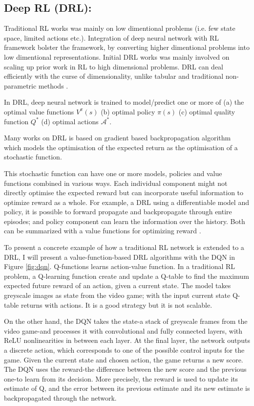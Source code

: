 \subsection*{Deep RL (DRL):}
Traditional RL works was mainly on low dimentional problems (i.e. few state space, limited actions etc.). Integration of deep neural network with RL framework bolster the framework, by converting higher dimentional problems into low dimentional representations. Initial DRL works was mainly involved on scaling up prior work in RL to high dimensional problems.
DRL can deal
efficiently with the curse of dimensionality, unlike tabular and
traditional non-parametric methods \cite{bengio2013representation}.

In DRL, deep neural network is trained to model/predict one or more of (a) the optimal value functions $V^\pi(s)$ (b) optimal policy $\pi(s)$
(c) optimal quality function $Q^*$ (d) optimal actions $\mathcal{A}^*$.

Many works on DRL is based on gradient based backpropagation algorithm \cite{heess2015learning, schulman2015gradient, rumelhart1985learning} which models the optimisation
of the expected return as the optimisation of a
stochastic function.

This stochastic function can have one or more
models, policies and value functions combined in various ways.
Each individual component might not directly optimise the expected reward but can incorporate useful information to optimize reward as a whole.
For example, a DRL using a differentiable model and policy,
it is possible to forward propagate and backpropagate through
entire episodes; and policy component can learn the information over the history. Both can be summarized with a value functions for optimizing reward \cite{heess2015learning}.

To present a concrete example of how a traditional RL network is extended to a DRL, I will present a value-function-based DRL algorithms
with the DQN in Figure \ref{fig:dqn}.
Q-functions learns action-value function. In a traditional RL problem, a Q-learning function create and update a Q-table to find the maximum expected future reward of an action, given a current state. The model takes greyscale images as state from the video game; with the input current state Q-table returns with actions. It is a good strategy but it is not scalable.

On the other hand, the DQN takes the state-a stack of greyscale frames from the video game-and processes it with convolutional and
fully connected layers, with ReLU nonlinearities in between each layer. At the final layer, the network outputs a discrete action, which corresponds to one of the possible control inputs for the game.  Given the current state and chosen action, the game returns a new score.
The DQN uses the reward-the difference
between the new score and the previous one-to learn from its decision. More precisely, the reward is used to update its estimate of Q, and the error between its previous estimate and its new estimate is backpropagated through the network.

